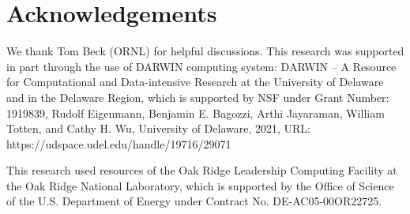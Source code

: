 \documentclass[journal=jpclcd,manuscript=article,articletitle=true,layout=twocolumn]{achemso}
\begin{document}
    
\section{Acknowledgements}
    We thank Tom Beck (ORNL) for helpful discussions. 
    This research was supported in part through the use of DARWIN computing system: DARWIN – A Resource for Computational and Data-intensive Research at the University of Delaware and in the Delaware Region, which is supported by NSF under Grant Number: 1919839, Rudolf Eigenmann, Benjamin E. Bagozzi, Arthi Jayaraman, William Totten, and Cathy H. Wu, University of Delaware, 2021, URL: https://udspace.udel.edu/handle/19716/29071

    This research used resources of the Oak Ridge Leadership Computing Facility at the Oak Ridge National Laboratory, which is supported by the Office of Science of the U.S. Department of Energy under Contract No. DE-AC05-00OR22725.
    


	
\end{document}
